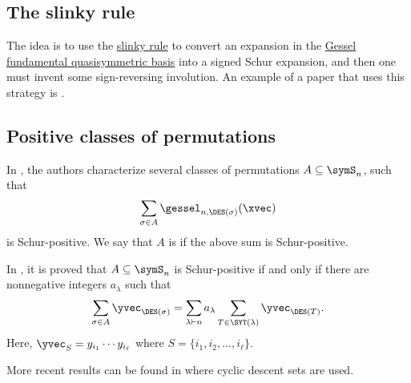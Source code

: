 \subsection[schurPositivitySlinky]{The slinky rule}

The idea is to use the \hyperref[gesselSlinkyRule]{slinky rule} to convert an expansion in
the \hyperref[gessel]{Gessel fundamental quasisymmetric basis} into a signed Schur expansion,
and then one must invent some sign-reversing involution.
An example of a paper that uses this strategy is \cite{Sergel2017}.



\subsection[schurPositivityPermutationClasses]{Positive classes of permutations}

In \cite{ElizaldeRoichman2016}, the authors characterize several classes of
permutations $A \subseteq \symS_n$,
such that
\[
\sum_{\sigma \in A} \gessel_{n,\DES(\sigma)}(\xvec)
\]
is Schur-positive.
We say that $A$ is  if the above sum is Schur-positive.


In \cite{AdinRoichman2015}, it is proved that $A \subseteq \symS_n$ is
Schur-positive if and only if there are nonnegative integers $a_\lambda$ such
that
\[
\sum_{\sigma \in A} \yvec_{\DES(\sigma)} = \sum_{\lambda \vdash n} a_\lambda \sum_{T \in \SYT(\lambda)} \yvec_{\DES(T)}.
\]
Here, $\yvec_{S}  = y_{i_1} \dotsm y_{i_\ell}$ where $S = \{i_1,i_2,\dotsc,i_\ell\}$.


More recent results can be found in \cite{BloomElizaldeRoichman2020} where cyclic descent sets are used.
